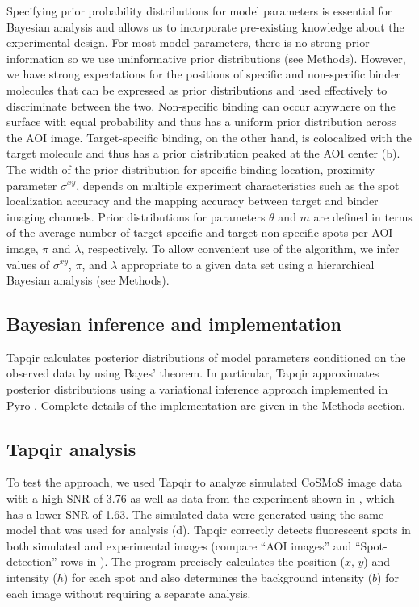 Specifying prior probability distributions for model parameters is essential for Bayesian analysis and allows us to incorporate pre-existing knowledge about the experimental design. For most model parameters, there is no strong prior information so we use uninformative prior distributions (see Methods). However, we have strong expectations for the positions of specific and non-specific binder molecules that can be expressed as prior distributions and used effectively to discriminate between the two. Non-specific binding can occur anywhere on the surface with equal probability and thus has a uniform prior distribution across the AOI image. Target-specific binding, on the other hand, is colocalized with the target molecule and thus has a prior distribution peaked at the AOI center (b). The width of the prior distribution for specific binding location, proximity parameter $\sigma^{xy}$, depends on multiple experiment characteristics such as the spot localization accuracy and the mapping accuracy between target and binder imaging channels. Prior distributions for parameters $\theta$ and $m$ are defined in terms of the average number of target-specific and target non-specific spots per AOI image, $\pi$ and $\lambda$, respectively. To allow convenient use of the algorithm, we infer values of $\sigma^{xy}$, $\pi$, and $\lambda$ appropriate to a given data set using a hierarchical Bayesian analysis (see Methods).



\subsection{Bayesian inference and implementation}

Tapqir calculates posterior distributions of model parameters conditioned on the observed data by using Bayes' theorem. In particular, Tapqir approximates posterior distributions using a variational inference approach implemented in Pyro \citep{Bingham2019-qy}.  Complete details of the implementation are given in the Methods section.

\subsection{Tapqir analysis}

To test the approach, we used Tapqir to analyze simulated CoSMoS image data with a high SNR of 3.76 as well as data from the experiment shown in , which has a lower SNR of 1.63. The simulated data were generated using the same model that was used for analysis (d). Tapqir correctly detects fluorescent spots in both simulated and experimental images (compare ``AOI images'' and ``Spot-detection'' rows in ). The program precisely calculates the position ($x$, $y$) and intensity ($h$) for each spot and also determines the background intensity ($b$) for each image without requiring a separate analysis. 

